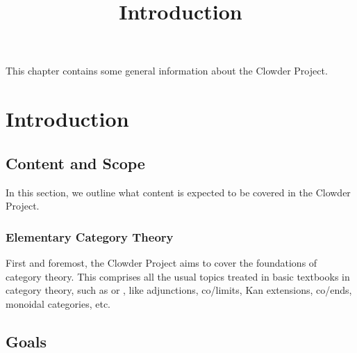 

%



\title{Introduction}

\maketitle

\label{section-phantom}

This chapter contains some general information about the Clowder Project.

\ChapterTableOfContents

\section{Introduction}\label{section-introduction}
\subsection{Content and Scope}\label{subsection-scope}
In this section, we outline what content is expected to be covered in the Clowder Project.
\subsubsection{Elementary Category Theory}\label{subsubsection-elementary-category-theory}
First and foremost, the Clowder Project aims to cover the foundations of category theory. This comprises all the usual topics treated in basic textbooks in category theory, such as \cite{categories-for-the-working-mathematician} or \cite{category-theory-in-context}, like adjunctions, co/limits, Kan extensions, co/ends, monoidal categories, etc.
\subsection{Goals}\label{subsection-goals}

